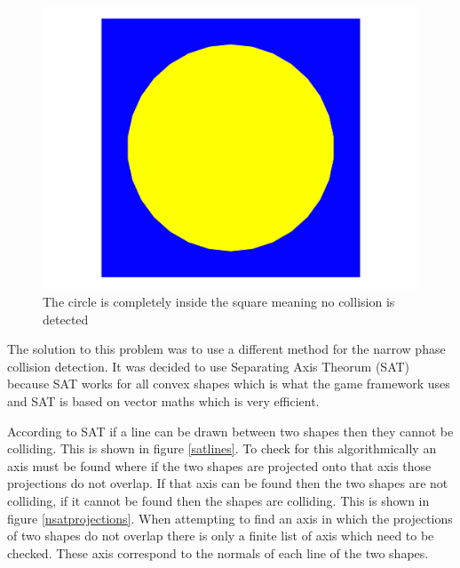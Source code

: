 \documentclass[]{report}
\begin{document}
			\begin{figure}[H]
				\centering
				\includegraphics[scale=0.25]{lineintersectionproblem}
				\caption{The circle is completely inside the square meaning no collision is detected}
				\label{lineintersectionproblem}
			\end{figure}
			
			The solution to this problem was to use a different method for the narrow phase collision detection. It was decided to use Separating Axis Theorum (SAT)\cite{sattutorial} because SAT works for all convex shapes which is what the game framework uses and SAT is based on vector maths which is very efficient. 
			
			According to SAT if a line can be drawn between two shapes then they cannot be colliding. This is shown in figure \ref{satlines}. To check for this algorithmically an axis must be found where if the two shapes are projected onto that axis those projections do not overlap. If that axis can be found then the two shapes are not colliding, if it cannot be found then the shapes are colliding. This is shown in figure \ref{nsatprojections}. When attempting to find an axis in which the projections of two shapes do not overlap there is only a finite list of axis which need to be checked. These axis correspond to the normals of each line of the two shapes\cite{sattutorial}.
			
\end{document}
